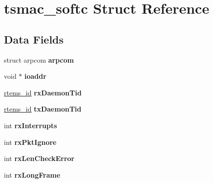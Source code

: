 \hypertarget{structtsmac__softc}{}\section{tsmac\+\_\+softc Struct Reference}
\label{structtsmac__softc}
\subsection*{Data Fields}
\begin{DoxyCompactItemize}
\item 
\mbox{\label{structtsmac__softc_af421710a109baed15aa028c93f64bc46}} 
struct arpcom {\bfseries arpcom}
\item 
\mbox{\label{structtsmac__softc_aaf2625665789196e75166135a81a3fc7}} 
void $\ast$ {\bfseries ioaddr}
\item 
\mbox{\label{structtsmac__softc_a5dc1071d5ef700ee5ad22d02ec4f934e}} 
\mbox{\hyperlink{group__ClassicTasks_gab20892b814dced7dd4e5b9bf42becd57}{rtems\+\_\+id}} {\bfseries rx\+Daemon\+Tid}
\item 
\mbox{\label{structtsmac__softc_aa72ed3804b3a0d697357fafd2a07e71f}} 
\mbox{\hyperlink{group__ClassicTasks_gab20892b814dced7dd4e5b9bf42becd57}{rtems\+\_\+id}} {\bfseries tx\+Daemon\+Tid}
\item 
\mbox{\label{structtsmac__softc_a719f121ea2e5b418bb7f88a32ca08e92}} 
int {\bfseries rx\+Interrupts}
\item 
\mbox{\label{structtsmac__softc_a3812d9d1aa0fe61c012a68e5bdf95701}} 
int {\bfseries rx\+Pkt\+Ignore}
\item 
\mbox{\label{structtsmac__softc_a2473a4ec025652b19899ff772d7ac8a4}} 
int {\bfseries rx\+Len\+Check\+Error}
\item 
\mbox{\label{structtsmac__softc_ab664ac57fe018401a438614207b099d7}} 
int {\bfseries rx\+Long\+Frame}
\item 
\mbox{\label{structtsmac__softc_a0c82516835de6db3e16d831afb75e9f8}} 

\end{DoxyCompactItemize}
